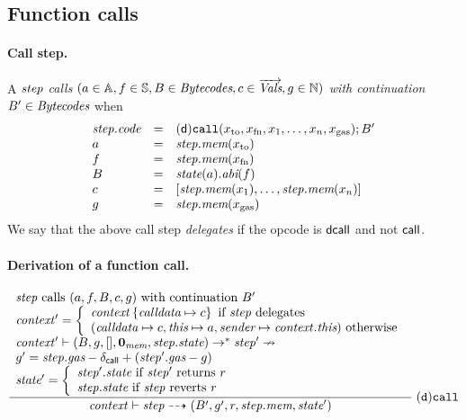\subsection{Function calls}

\paragraph{Call step.}
A $\mathit{step}$ \emph{calls $(a\in\mathbb{A},f\in\mathbb{S},B\in\textit{Bytecodes},c\in\overrightarrow{\textit{Vals}},g\in\mathbb{N})$ with continuation} $B'\in\textit{Bytecodes}$ when
$$
\begin{array}{lll}
    \mathit{step}.\textit{code} &=&  \mathsf{(d)}\mathtt{call}(x_{\rm to},x_{\rm fn},x_1,\dots,x_n, x_{\rm gas});B' \\
    a & =& \mathit{step}.\textit{mem}(x_{\rm to}) \\
    f & =& \mathit{step}.\textit{mem}(x_{\rm fn}) \\
    B &=& \textit{state}(a).\textit{abi}(f)\\
    c & =& [\mathit{step}.\textit{mem}(x_1),\dots,\mathit{step}.\textit{mem}(x_n)] \\
    g & =&\mathit{step}.\textit{mem}(x_{\rm gas}) 
\end{array}
$$
We say that the above call step \emph{delegates} if the opcode is ${\sf dcall}$ and not ${\sf call}$.

\paragraph{Derivation of a function call.}

$$
\dfrac{
	\begin{array}{l}
	\textrm{$\mathit{step}$ calls $(a,f,B,c,g)$ with continuation $B'$} \\
	\mathit{context}' = \left\{\begin{array}{l}
	\mathit{context}\left\{\textit{calldata}\mapsto c\right\} \textrm{ if $\mathit{step}$ delegates}\\
	(\textit{calldata}\mapsto c,\textit{this}\mapsto a,\textit{sender}\mapsto\mathit{context}.\textit{this}) \textrm{ otherwise}\\
	\end{array}\right. \\
	\mathit{context}'\vdash (B,g,[],\mathbf{0}_{\textit{mem}},\mathit{step}.\textit{state})\to^* \mathit{step}' \nrightarrow \\
	g' = \mathit{step}.\textit{gas}-\delta_{\mathsf{call}}+(\mathit{step}'.\textit{gas}-g) \\
	\textit{state}' =\left\{
    \begin{array}{l}
        \textrm{$\mathit{step}'.\textit{state}$ if $\mathit{step}'$ returns $r$}\\
        \textrm{$\mathit{step}.\textit{state}$ if $\mathit{step}$ reverts $r$}
    \end{array}\right.
	\end{array}
}
{\mathit{context}\vdash\mathit{step} \dashrightarrow (B',g' ,r,\mathit{step}.\textit{mem},\textit{state}')}\;\mathtt{(d)call}
$$

